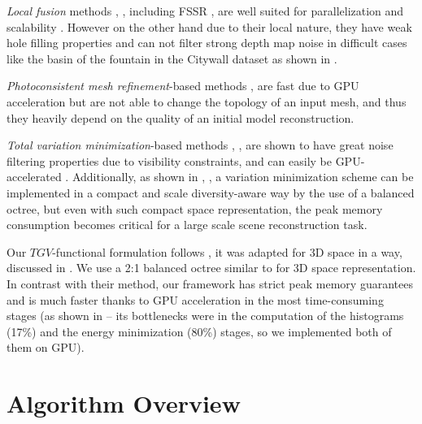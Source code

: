 \documentclass[10pt,twocolumn,letterpaper]{article}
\begin{document}
\textit{Local fusion} methods \cite{curless1996volumetric}, \cite{kuhn2015incremental}, \cite{kuhn2017tv} including FSSR \cite{fuhrmann2014floating}, \cite{fuhrmann2014mve}
are well suited for parallelization and scalability \cite{kuhn2015incremental}.
However on the other hand due to their local nature, they have weak hole filling properties and can not filter strong depth map noise
in difficult cases like the basin of the fountain in the Citywall dataset as shown in \cite{ummenhofer2015global}.

\textit{Photoconsistent mesh refinement}-based methods \cite{vu2011high}, \cite{li2016efficient} are fast due to GPU acceleration but are not able to change the topology of an input mesh,
and thus they heavily depend on the quality of an initial model reconstruction.

\textit{Total variation minimization}-based methods \cite{zach2007globally}, \cite{graber2011online}, \cite{pock2011tgv} are shown to have great noise filtering properties due to visibility constraints,
and can easily be GPU-accelerated \cite{zach2008fast}. Additionally, as shown in \cite{ummenhofer2015global}, \cite{ummenhofer2017global}, a variation minimization scheme can be implemented
in a compact and scale diversity-aware way by the use of a balanced octree, but even with such compact space representation, the peak memory consumption becomes critical for a large scale scene reconstruction task.

Our $TGV$-functional formulation follows \cite{pock2011tgv}, it was adapted for 3D space in a way, discussed in \cite{zach2007globally}.
We use a 2:1 balanced octree similar to \cite{ummenhofer2015global} for 3D space representation.
In contrast with their method, our framework has strict peak memory guarantees and is much faster thanks to GPU acceleration in the most time-consuming stages (as shown in \cite{ummenhofer2015global} -- its bottlenecks were in the computation of the histograms (17\%) and the energy minimization (80\%) stages, so we implemented both of them on GPU).

\section{Algorithm Overview}
\end{document}
